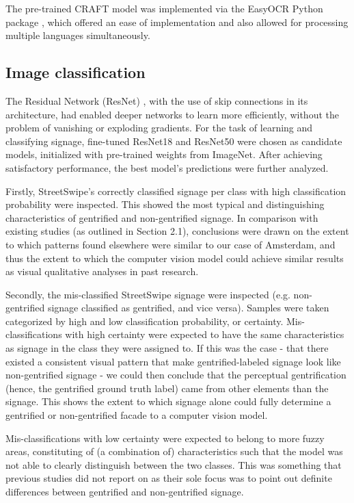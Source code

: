 The pre-trained CRAFT model was implemented via the EasyOCR Python package \cite{noauthor_jaided_nodate}, which offered an ease of implementation and also allowed for processing multiple languages simultaneously.

\subsection{Image classification}
The Residual Network (ResNet) \cite{resnet}, with the use of skip connections in its architecture, had enabled deeper networks to learn more efficiently, without the problem of vanishing or exploding gradients. For the task of learning and classifying signage, fine-tuned ResNet18 and ResNet50 were chosen as candidate models, initialized with pre-trained weights from ImageNet. After achieving satisfactory performance, the best model's predictions were further analyzed. 

Firstly, StreetSwipe's correctly classified signage per class with high classification probability were inspected. This showed the most typical and distinguishing characteristics of gentrified and non-gentrified signage. In comparison with existing studies (as outlined in Section 2.1), conclusions were drawn on the extent to which patterns found elsewhere were similar to our case of Amsterdam, and thus the extent to which the computer vision model could achieve similar results as visual qualitative analyses in past research.

Secondly, the mis-classified StreetSwipe signage were inspected (e.g. non-gentrified signage classified as gentrified, and vice versa). Samples were taken categorized by high and low classification probability, or certainty. Mis-classifications with high certainty were expected to have the same characteristics as signage in the class they were assigned to. If this was the case - that there existed a consistent visual pattern that make gentrified-labeled signage look like non-gentrified signage - we could then conclude that the perceptual gentrification (hence, the gentrified ground truth label) came from other elements than the signage. This shows the extent to which signage alone could fully determine a gentrified or non-gentrified facade to a computer vision model.

Mis-classifications with low certainty were expected to belong to more fuzzy areas, constituting of (a combination of) characteristics such that the model was not able to clearly distinguish between the two classes. This was something that previous studies did not report on as their sole focus was to point out definite differences between gentrified and non-gentrified signage.

